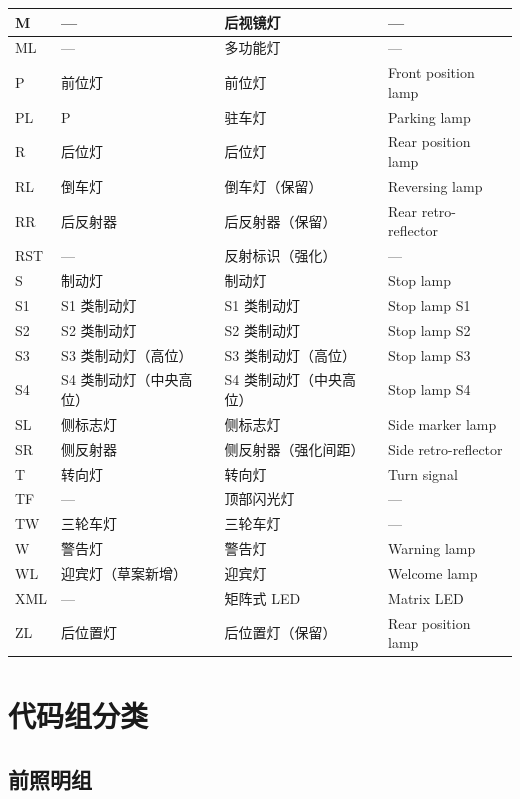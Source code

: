 \begin{table}[H]
\begin{tabularx}{\textwidth}{|l|X|X|X|}
\hline
M & --- & 后视镜灯 & --- \\
\hline
ML & --- & 多功能灯 & --- \\
\hline
P & 前位灯 & 前位灯 & Front position lamp \\
\hline
PL & P & 驻车灯 & Parking lamp \\
\hline
R & 后位灯 & 后位灯 & Rear position lamp \\
\hline
RL & 倒车灯 & 倒车灯（保留） & Reversing lamp \\
\hline
RR & 后反射器 & 后反射器（保留） & Rear retro-reflector \\
\hline
RST & --- & 反射标识（强化） & --- \\
\hline
S & 制动灯 & 制动灯 & Stop lamp \\
\hline
S1 & S1 类制动灯 & S1 类制动灯 & Stop lamp S1 \\
\hline
S2 & S2 类制动灯 & S2 类制动灯 & Stop lamp S2 \\
\hline
S3 & S3 类制动灯（高位） & S3 类制动灯（高位） & Stop lamp S3 \\
\hline
S4 & S4 类制动灯（中央高位） & S4 类制动灯（中央高位） & Stop lamp S4 \\
\hline
SL & 侧标志灯 & 侧标志灯 & Side marker lamp \\
\hline
SR & 侧反射器 & 侧反射器（强化间距） & Side retro-reflector \\
\hline
T & 转向灯 & 转向灯 & Turn signal \\
\hline
TF & --- & 顶部闪光灯 & --- \\
\hline
TW & 三轮车灯 & 三轮车灯 & --- \\
\hline
W & 警告灯 & 警告灯 & Warning lamp \\
\hline
WL & 迎宾灯（草案新增） & 迎宾灯 & Welcome lamp \\
\hline
XML & --- & 矩阵式 LED & Matrix LED \\
\hline
ZL & 后位置灯 & 后位置灯（保留） & Rear position lamp \\
\hline
\end{tabularx}
\end{table}

\section{代码组分类}

\subsection{前照明组}

